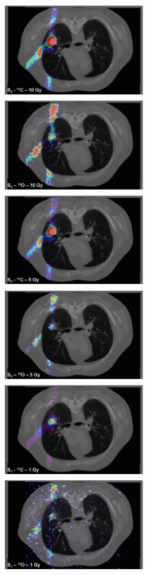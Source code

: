 \documentclass[11pt]{iopart}
\providecommand{\DIFdelendFL}{} %
\begin{document}
\begin{figure}[!h]
\DIFdelendFL \includegraphics[width=6cm,height=40mm]{figures/C11_10Gy_v1.jpg}
  \includegraphics[width=6cm,height=40mm]{figures/O15_10Gy_v1.jpg}
  \includegraphics[width=6cm,height=40mm]{figures/C11_5Gy_v1.jpg}
  \includegraphics[width=6cm,height=40mm]{figures/O15_5Gy_v1.jpg}
  \includegraphics[width=6cm,height=40mm]{figures/C11_1Gy_v1.jpg}
  \includegraphics[width=6cm,height=40mm]{figures/O15_1Gy_v1.jpg}

\end{figure}
\end{document}
